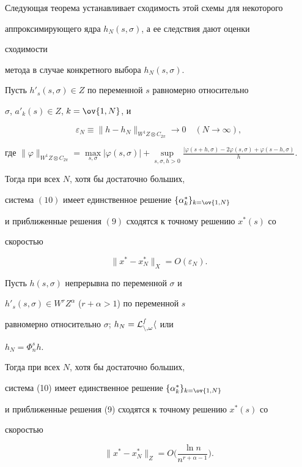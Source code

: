  


Следующая теорема устанавливает сходимость этой схемы для некоторого 


аппроксимирующего ядра $h_N(s,\sigma)$, а ее следствия дают оценки 


сходимости 


метода в случае конкретного выбора $h_N(s,\sigma)$. 


 


\begin{thm} 


Пусть $h'_s(s,\sigma)\in Z$ по переменной $s$ равномерно относительно 


$\sigma$, $a'_k(s)\in Z$, $k=\ov{1,N}$, и 


$$ 


\varepsilon_N\equiv\|h-h_N\|_{W^1Z\otimes C_{2\pi}} 


\to0\quad (N\to\infty), 


$$ 


где $\|\varphi\|_{W^1Z\otimes C_{2\pi}}= \max\limits_{s,\sigma} 


|\varphi(s,\sigma)|+ \sup\limits_{s,\sigma,h>0} 


\frac{|\varphi(s+h,\sigma)- 2\varphi(s,\sigma)+ \varphi(s-h,\sigma)}{h}$. 


Тогда при всех $N$, хотя бы достаточно больших, 


система $(10)$ имеет единственное решение $\{\alpha^*_k\}_{k=\ov{1,N}}$ 


и приближенные решения $(9)$ сходятся к точному решению $x^*(s)$ со 


скоростью 


$$ 


\|x^*-x^*_N\|_X=O(\varepsilon_N). 


$$ 


\end{thm} 


 


\begin{cor} 


Пусть $h(s,\sigma)$ непрерывна по переменной $\sigma$ и 


$h'_s(s,\sigma)\in W^r Z^\alpha$ ($r+\alpha>1$) по переменной $s$ 


равномерно относительно $\sigma$; $h_N=\cal L^s_{n,\omega}h$ или 


$h_N=\Phi^s_n h$. 


Тогда при всех $N$, хотя бы достаточно больших, 


система (10) имеет единственное решение $\{\alpha^*_k\}_{k=\ov{1,N}}$ 


и приближенные решения (9) сходятся к точному решению $x^*(s)$ со 


скоростью 


$$ 


\|x^*-x^*_N\|_Z=O\bigg(\frac{\ln n}{n^{r+\alpha-1}} \bigg). 


$$ 


\end{cor} 


